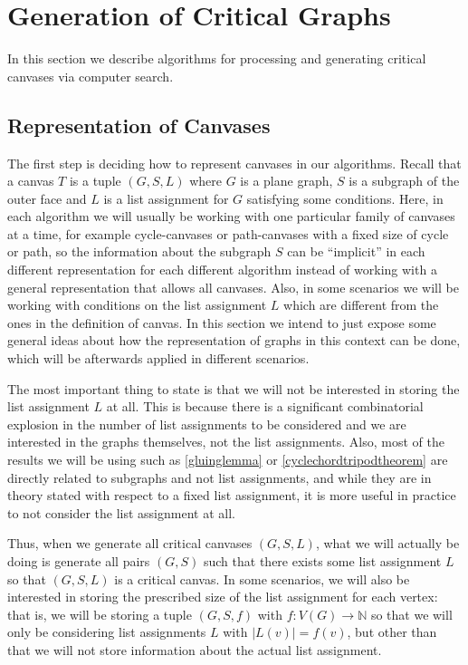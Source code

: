 \section{Generation of Critical Graphs}

In this section we describe algorithms for processing and generating critical canvases via computer search.

\subsection{Representation of Canvases}

The first step is deciding how to represent canvases in our algorithms. Recall that a canvas $T$ is a tuple 
$(G, S, L)$ where $G$ is a plane graph, $S$ is a subgraph of the outer face and $L$ is a list assignment for 
$G$ satisfying some conditions. Here, in each algorithm we will usually be working with one particular family of 
canvases at a time, for example cycle-canvases or path-canvases with a fixed size of cycle or path, so the 
information about the subgraph $S$ can be ``implicit'' in each different representation for each different algorithm
instead of working with a general representation that allows all canvases. Also, in some scenarios we will be 
working with conditions on the list assignment $L$ which are different from the ones in the definition of canvas.
In this section we intend to just expose some general ideas about how the representation of graphs in this context
can be done, which will be afterwards applied in different scenarios.

The most important thing to state is that we will not be interested in storing the list assignment $L$ at all. 
This is because there is a significant combinatorial explosion in the number of list assignments to be considered and
we are interested in the graphs themselves, not the list assignments. Also, most of the results
we will be using such as \ref{gluinglemma} or \ref{cyclechordtripodtheorem} are directly related to subgraphs
and not list assignments, and while they are in theory stated with respect to a fixed list assignment, it is more
useful in practice to not consider the list assignment at all. 

Thus, when we generate all critical canvases $(G, S, L)$, what we will actually be doing is generate all pairs $(G, S)$ 
such that there exists some list assignment $L$  so that $(G, S, L)$ is a critical canvas. In some scenarios, we will also
be interested in storing the prescribed size of the list assignment for each vertex: that is, we will be storing a tuple $(G, S, f)$
with $f : V(G) \rightarrow \mathbb{N}$ so that we will only be considering list assignments $L$ with $|L(v)| = f(v)$, but other
than that we will not store information about the actual list assignment. 

